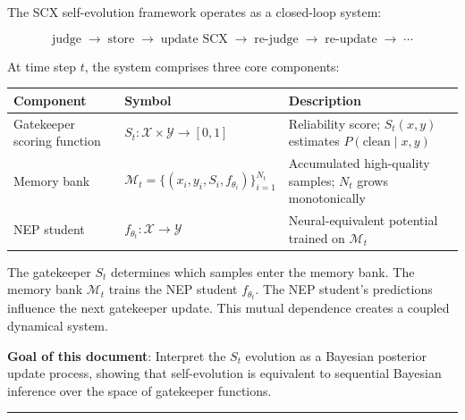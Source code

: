 \documentclass[
  12pt,
]{article}
\begin{document}
The SCX self-evolution framework operates as a closed-loop system:

\[
\text{judge} \;\to\; \text{store} \;\to\; \text{update SCX} \;\to\; \text{re-judge} \;\to\; \text{re-update} \;\to\; \cdots
\]

At time step \(t\), the system comprises three core components:

\begin{longtable}[]{@{}
  >{\raggedright\arraybackslash}p{}
  >{\raggedright\arraybackslash}p{}
  >{\raggedright\arraybackslash}p{}@{}}
\toprule\noalign{}
\begin{minipage}[b]{\linewidth}\raggedright
Component
\end{minipage} & \begin{minipage}[b]{\linewidth}\raggedright
Symbol
\end{minipage} & \begin{minipage}[b]{\linewidth}\raggedright
Description
\end{minipage} \\
\midrule\noalign{}
\endhead
\bottomrule\noalign{}
\endlastfoot
Gatekeeper scoring function &
\(S_t: \mathcal{X} \times \mathcal{Y} \to [0,1]\) & Reliability score;
\(S_t(x,y)\) estimates \(P(\text{clean} \mid x, y)\) \\
Memory bank &
\(\mathcal{M}_t = \{(x_i, y_i, S_i, f_{\theta_i})\}_{i=1}^{N_t}\) &
Accumulated high-quality samples; \(N_t\) grows monotonically \\
NEP student & \(f_{\theta_t}: \mathcal{X} \to \mathcal{Y}\) &
Neural-equivalent potential trained on \(\mathcal{M}_t\) \\
\end{longtable}

The gatekeeper \(S_t\) determines which samples enter the memory bank.
The memory bank \(\mathcal{M}_t\) trains the NEP student
\(f_{\theta_t}\). The NEP student's predictions influence the next
gatekeeper update. This mutual dependence creates a coupled dynamical
system.

\textbf{Goal of this document}: Interpret the \(S_t\) evolution as a
Bayesian posterior update process, showing that self-evolution is
equivalent to sequential Bayesian inference over the space of gatekeeper
functions.

\begin{center}\rule{0.5\linewidth}{0.5pt}\end{center}
\end{document}
